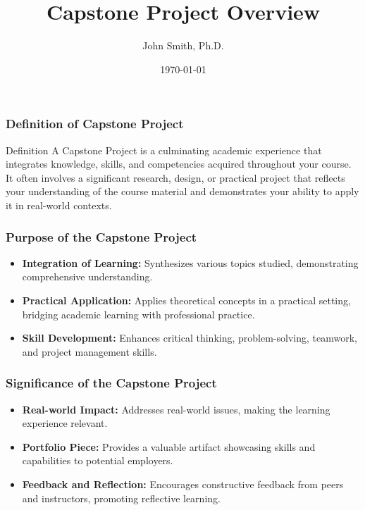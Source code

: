 \documentclass[aspectratio=169]{beamer}
\begin{document}
\frame{\titlepage}

\begin{frame}[fragile]
    \title{Capstone Project Overview}
    \author{John Smith, Ph.D.}
    \date{\today}
    \titlepage
\end{frame}

\begin{frame}[fragile]
    \frametitle{Definition of Capstone Project}
    \begin{block}{Definition}
        A Capstone Project is a culminating academic experience that integrates knowledge, skills, and competencies acquired throughout your course. It often involves a significant research, design, or practical project that reflects your understanding of the course material and demonstrates your ability to apply it in real-world contexts.
    \end{block}
\end{frame}

\begin{frame}[fragile]
    \frametitle{Purpose of the Capstone Project}
    \begin{itemize}
        \item \textbf{Integration of Learning:} Synthesizes various topics studied, demonstrating comprehensive understanding.
        \item \textbf{Practical Application:} Applies theoretical concepts in a practical setting, bridging academic learning with professional practice.
        \item \textbf{Skill Development:} Enhances critical thinking, problem-solving, teamwork, and project management skills.
    \end{itemize}
\end{frame}

\begin{frame}[fragile]
    \frametitle{Significance of the Capstone Project}
    \begin{itemize}
        \item \textbf{Real-world Impact:} Addresses real-world issues, making the learning experience relevant.
        \item \textbf{Portfolio Piece:} Provides a valuable artifact showcasing skills and capabilities to potential employers.
        \item \textbf{Feedback and Reflection:} Encourages constructive feedback from peers and instructors, promoting reflective learning.
    \end{itemize}
\end{frame}
\end{document}
